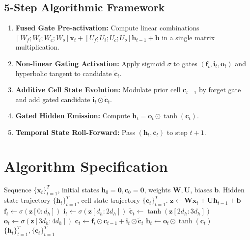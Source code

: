 \documentclass[11pt,a4paper]{article}
\theoremstyle{definition}
\begin{document}
\subsection{5-Step Algorithmic Framework}
\begin{enumerate}
    \item \textbf{Fused Gate Pre-activation:} Compute linear combinations $[W_f; W_i; W_c; W_o] \mathbf{x}_t + [U_f; U_i; U_c; U_o] \mathbf{h}_{t-1} + \mathbf{b}$ in a single matrix multiplication.
    \item \textbf{Non-linear Gating Activation:} Apply sigmoid $\sigma$ to gates $(\mathbf{f}_t, \mathbf{i}_t, \mathbf{o}_t)$ and hyperbolic tangent to candidate $\tilde{\mathbf{c}}_t$.
    \item \textbf{Additive Cell State Evolution:} Modulate prior cell $\mathbf{c}_{t-1}$ by forget gate and add gated candidate $\mathbf{i}_t \odot \tilde{\mathbf{c}}_t$.
    \item \textbf{Gated Hidden Emission:} Compute $\mathbf{h}_t = \mathbf{o}_t \odot \tanh(\mathbf{c}_t)$.
    \item \textbf{Temporal State Roll-Forward:} Pass $(\mathbf{h}_t, \mathbf{c}_t)$ to step $t+1$.
\end{enumerate}

\section{Algorithm Specification}

\begin{algorithm}[H]
\caption{Long Short-Term Memory Step and Unroll}
\label{alg:lstm}
\begin{algorithmic}[1]
\Require Sequence $\{\mathbf{x}_t\}_{t=1}^T$, initial states $\mathbf{h}_0 = \mathbf{0}, \mathbf{c}_0 = \mathbf{0}$, weights $\mathbf{W}, \mathbf{U}$, biases $\mathbf{b}$.
\Ensure Hidden state trajectory $\{\mathbf{h}_t\}_{t=1}^T$, cell state trajectory $\{\mathbf{c}_t\}_{t=1}^T$.
    \State $\mathbf{z} \gets \mathbf{W} \mathbf{x}_t + \mathbf{U} \mathbf{h}_{t-1} + \mathbf{b}$
    \State $\mathbf{f}_t \gets \sigma(\mathbf{z}[0 : d_h])$
    \State $\mathbf{i}_t \gets \sigma(\mathbf{z}[d_h : 2d_h])$
    \State $\tilde{\mathbf{c}}_t \gets \tanh(\mathbf{z}[2d_h : 3d_h])$
    \State $\mathbf{o}_t \gets \sigma(\mathbf{z}[3d_h : 4d_h])$
    \State $\mathbf{c}_t \gets \mathbf{f}_t \odot \mathbf{c}_{t-1} + \mathbf{i}_t \odot \tilde{\mathbf{c}}_t$
    \State $\mathbf{h}_t \gets \mathbf{o}_t \odot \tanh(\mathbf{c}_t)$
\EndFor
\State \Return $\{\mathbf{h}_t\}_{t=1}^T, \{\mathbf{c}_t\}_{t=1}^T$
\end{algorithmic}
\end{algorithm}
\end{document}
